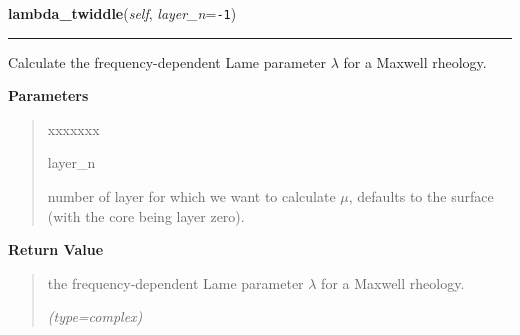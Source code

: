 \hspace{.8\funcindent}\begin{boxedminipage}{\funcwidth}

    \raggedright \textbf{lambda\_twiddle}(\textit{self}, \textit{layer\_n}={\tt -1})

    \vspace{-1.5ex}

    \rule{\textwidth}{0.5\fboxrule}
\setlength{\parskip}{2ex}
    Calculate the frequency-dependent Lame parameter \(\lambda\) for a 
    Maxwell rheology.

\setlength{\parskip}{1ex}
      \textbf{Parameters}
      \vspace{-1ex}

      \begin{quote}
        \begin{Ventry}{xxxxxxx}

          \item[layer\_n]

          number of layer for which we want to calculate \(\mu\), defaults 
          to the surface (with the core being layer zero).

        \end{Ventry}

      \end{quote}

      \textbf{Return Value}
    \vspace{-1ex}

      \begin{quote}
      the frequency-dependent Lame parameter \(\lambda\) for a Maxwell 
      rheology.

      {\it (type=complex)}

      \end{quote}

    \end{boxedminipage}

    \label{SatStress:SatStress:StressDef:alpha}

    \vspace{0.5ex}

